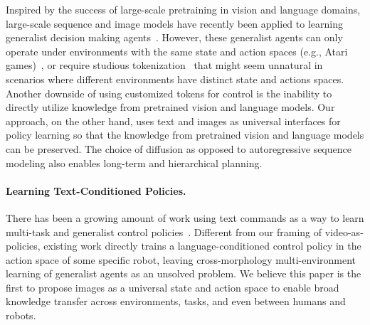  Inspired by the success of large-scale pretraining in vision and language domains, large-scale sequence and image models have recently been applied to learning generalist decision making agents~\citep{reed2022generalist,lee2022multi,kumar2022offline}. However, these generalist agents can only operate under environments with the same state and action spaces (e.g., Atari games)~\cite{lee2022multi,kumar2022offline}, or require studious tokenization~\citep{reed2022generalist} that might seem unnatural in %
scenarios
where different environments have distinct state and actions spaces. Another downside of using customized tokens for control is the inability to directly utilize knowledge from pretrained vision and language models. Our approach, on the other hand, uses text and images as universal interfaces for policy learning so that the knowledge from pretrained vision and language models can be preserved. The choice of diffusion as opposed to autoregressive sequence modeling also enables long-term and hierarchical planning. 

\paragraph{Learning Text-Conditioned Policies.} There has been a growing amount of work using text commands as a way to learn multi-task and generalist control policies~\citep{huang2022inner,ahn2022can,brohan2022rt,lynch2020language,mahmoudieh2022zero,liu2022instruction}. Different from our framing of video-as-policies, existing work directly trains a language-conditioned control policy in the action space of some specific robot, leaving cross-morphology multi-environment learning of generalist agents as an unsolved problem. We believe this paper is the first to propose images as a universal state and action space to enable broad knowledge transfer across environments, tasks, and even between humans and robots.
